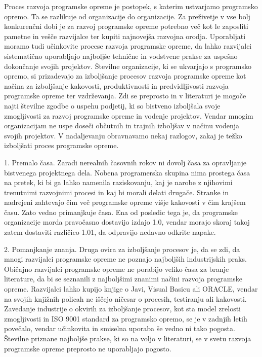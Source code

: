 \documentclass[a4paper,12pt,openright]{book}
\begin{document}
Proces razvoja programske opreme je postopek, s katerim ustvarjamo programsko opremo. Ta se razlikuje od organizacije do organizacije. Za preživetje v vse bolj konkurenčni dobi je za razvoj programske opreme potrebno več kot le zaposliti pametne in vešče razvijalce ter kupiti najnovejša razvojna orodja. Uporabljati moramo tudi učinkovite procese razvoja programske opreme, da lahko razvijalci sistematično uporabljajo najboljše tehnične in vodstvene prakse za uspešno dokončanje svojih projektov. Številne organizacije, ki se ukvarjajo s programsko opremo, si prizadevajo za izboljšanje procesov razvoja programske opreme kot načina za izboljšanje kakovosti, produktivnosti in predvidljivosti razvoja programske opreme ter vzdrževanja.
Zdi se preprosto in v literaturi je mogoče najti številne zgodbe o uspehu podjetij, ki so bistveno izboljšala svoje zmogljivosti za razvoj programske opreme in vodenje projektov. Vendar mnogim organizacijam ne uspe doseči občutnih in trajnih izboljšav v načinu vodenja svojih projektov. V nadaljevanju obravnavamo nekaj razlogov, zakaj je težko izboljšati proces programske opreme.

1. Premalo časa. Zaradi nerealnih časovnih rokov ni dovolj časa za opravljanje bistvenega projektnega dela. Nobena programerska skupina nima prostega časa na pretek, ki bi ga lahko namenila raziskovanju, kaj je narobe z njihovimi trenutnimi razvojnimi procesi in kaj bi morali delati drugače. Stranke in nadrejeni zahtevajo čim več programske opreme višje kakovosti v čim krajšem času. Zato vedno primanjkuje časa. Ena od posledic tega je, da programske organizacije morda pravočasno dostavijo izdajo 1.0, vendar morajo skoraj takoj zatem dostaviti različico 1.01, da odpravijo nedavno odkrite napake.

2. Pomanjkanje znanja. Druga ovira za izboljšanje procesov je, da se zdi, da mnogi razvijalci programske opreme ne poznajo najboljših industrijskih praks. Običajno razvijalci programske opreme ne porabijo veliko časa za branje literature, da bi se seznanili z najboljšimi znanimi načini razvoja programske opreme. Razvijalci lahko kupijo knjige o Javi, Visual Basicu ali ORACLE, vendar na svojih knjižnih policah ne iščejo ničesar o procesih, testiranju ali kakovosti.
Zavedanje industrije o okvirih za izboljšanje procesov, kot sta model zrelosti zmogljivosti in ISO 9001 standard za programsko opremo, se je v zadnjih letih povečalo, vendar učinkovita in smiselna uporaba še vedno ni tako pogosta. Številne priznane najboljše prakse, ki so na voljo v literaturi, se v svetu razvoja programske opreme preprosto ne uporabljajo pogosto.
\end{document}

